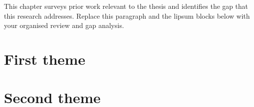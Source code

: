 %

This chapter surveys prior work relevant to the thesis and identifies the gap that this research addresses. Replace this paragraph and the lipsum blocks below with your organised review and gap analysis.

\lipsum[1-4]

\section{First theme}\label{sec:lit-first}

\lipsum[5-7]

\section{Second theme}\label{sec:lit-second}

\lipsum[8-10]
